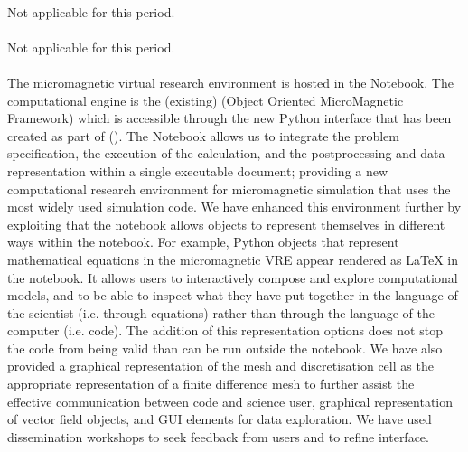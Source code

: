 \documentclass{deliverablereport}
\begin{document}
\paragraph{} %

Not applicable for this period.

\paragraph{} %

Not applicable for this period.

\paragraph{} %

The micromagnetic virtual research environment is hosted in the \Jupyter
Notebook. The computational engine is the (existing) \OOMMF (Object Oriented
MicroMagnetic Framework) which is accessible through the new Python interface
that has been created as part of \ODK  
(). The \Jupyter Notebook allows us to
integrate the problem specification, the execution of the calculation, and the
postprocessing and data representation within a single executable document;
providing a new computational research environment for micromagnetic
simulation that uses the most widely used simulation code. We have enhanced
this environment further by exploiting that the notebook allows objects to
represent themselves in different ways within the notebook. For example,
Python objects that represent mathematical equations in the micromagnetic VRE
appear rendered as \LaTeX{} in the notebook. It allows users to interactively
compose and explore computational models, and to be able to inspect what they
have put together in the language of the scientist (i.e. through equations)
rather than through the language of the computer (i.e. code). The addition of
this representation options does not stop the code from being valid \Python
than can be run outside the notebook. We have also provided a graphical
representation of the mesh and discretisation cell as the appropriate
representation of a finite difference mesh to further assist the effective
communication between code and science user, graphical representation of
vector field objects, and GUI elements for data exploration. We have used dissemination workshops 
to seek feedback from users and to refine interface.
\end{document}
